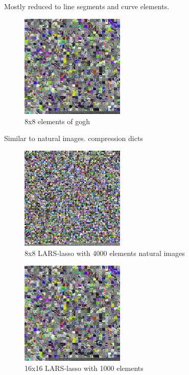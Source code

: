 Mostly reduced to line segments and curve elements.

\begin{figure}
\centering
\includegraphics[width = 0.44\textwidth]{images/16_1000_1000_10_lasso.png}
\caption{8x8 elements of gogh}
\label{fig:16_1000_lasso}
\end{figure}

Similar to natural images.
compression dicts

\begin{figure}
\centering
\includegraphics[width = 0.44\textwidth]{images/8_4000_10000_10_lasso.png} 
\caption{8x8 LARS-lasso with 4000 elements natural images}
\label{fig:8_4000_lasso}
\end{figure}


\begin{figure}
\centering
\includegraphics[width = 0.44\textwidth]{images/16_1000_1000_10_lasso.png}
\caption{16x16 LARS-lasso with 1000 elements}
\label{fig:16_1000_lasso}
\end{figure}

